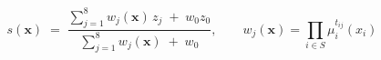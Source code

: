 

\begin{equation*}
s(\mathbf{x}) \;=\; \frac{\sum_{j=1}^{8} w_j(\mathbf{x})\, z_j \;+\; w_0 z_0}{\sum_{j=1}^{8} w_j(\mathbf{x}) \;+\; w_0},
\qquad w_j(\mathbf{x}) = \prod_{i\in S} \mu_i^{t_{ij}}(x_i)
\tag{1}
\end{equation*}

